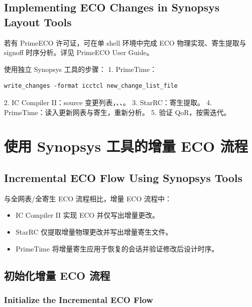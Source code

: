 \subsection*{Implementing ECO Changes in Synopsys Layout Tools}

\begin{noteBox}
若有 PrimeECO 许可证，可在单 shell 环境中完成 ECO 物理实现、寄生提取与 signoff 时序分析。详见 PrimeECO User Guide。
\end{noteBox}

使用独立 Synopsys 工具的步骤：
1. PrimeTime：
\begin{lstlisting}
write_changes -format icctcl new_change_list_file
\end{lstlisting}

2. IC Compiler II：source 变更列表，、、。
3. StarRC：寄生提取。
4. PrimeTime：读入更新网表与寄生，重新分析。
5. 验证 QoR，按需迭代。

\section{使用 Synopsys 工具的增量 ECO 流程}
\subsection*{Incremental ECO Flow Using Synopsys Tools}

与全网表/全寄生 ECO 流程相比，增量 ECO 流程中：
\begin{itemize}
  \item IC Compiler II 实现 ECO 并仅写出增量更改。
  \item StarRC 仅提取增量物理更改并写出增量寄生文件。
  \item PrimeTime 将增量寄生应用于恢复的会话并验证修改后设计时序。
\end{itemize}



\subsection{初始化增量 ECO 流程}
\subsubsection*{Initialize the Incremental ECO Flow}

